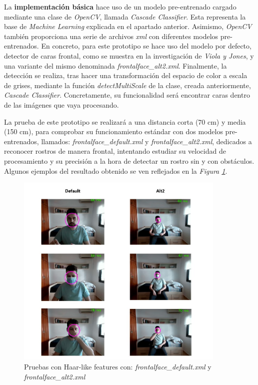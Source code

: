La \textbf{implementación básica} hace uso de un modelo pre-entrenado cargado mediante una clase de \textit{OpenCV}, llamada \textit{Cascade Classifier}. Esta representa la base de \textit{Machine Learning} explicada en el apartado anterior. Asimismo, \textit{OpenCV} también proporciona una serie de archivos \textit{xml} con diferentes modelos pre-entrenados. En concreto, para este prototipo se hace uso del modelo por defecto, detector de caras frontal, como se muestra en la investigación de \textit{Viola y Jones}, y una variante del mismo denominada \textit{frontalface\_alt2.xml}. Finalmente, la detección se realiza, tras hacer una transformación del espacio de color a escala de grises, mediante la función \textit{detectMultiScale} de la clase, creada anteriormente, \textit{Cascade Classifier}. Concretamente, su funcionalidad será encontrar caras dentro de las imágenes que vaya procesando.

La prueba de este prototipo se realizará a una distancia corta (70 cm)  y media (150 cm), para comprobar su funcionamiento estándar con dos modelos pre-entrenados, llamados:  \textit{frontalface\_default.xml} y \textit{frontalface\_alt2.xml}, dedicados a reconocer rostros de manera frontal, intentando estudiar su velocidad de procesamiento y su precisión a la hora de detectar un rostro sin y con obstáculos. Algunos ejemplos del resultado obtenido se ven reflejados en la \textit{Figura \ref{fig:haar1}}.

\begin{figure}[htp]
	\centering
	\includegraphics[width=10cm]{imagenes/prueba_proto1.jpg}
	\caption[Pruebas con Haar-like features con: \textit{frontalface\_default} y \textit{frontalface\_alt2}]{Pruebas con Haar-like features con: \textit{frontalface\_default.xml} y \textit{frontalface\_alt2.xml}}
	\label{fig:haar1}
\end{figure}

